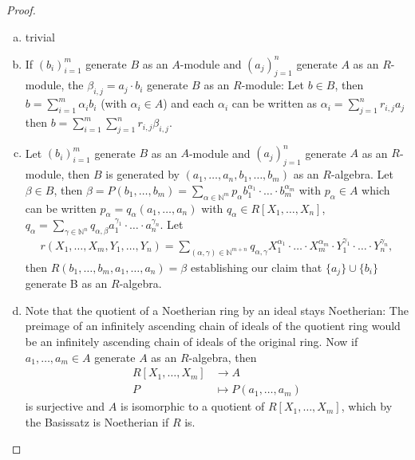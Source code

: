 \documentclass[DIV=14,parskip=half]{scrartcl}
\theoremstyle{definition}
\newcommand{\N}{\mathbb{N}}
\newcommand{\longto}{\longrightarrow}
\newcommand{\ldotspam}{,\ldots,}
\begin{document}
\begin{proof}
 \begin{enumerate}[a)]
  \item trivial
  \item If $(b_i)_{i=1}^m$ generate $B$ as an $A$-module and $(a_j)_{j=1}^n$ generate $A$ as an $R$-module, the $\beta_{i,j} = a_j\cdot b_i$ generate $B$ as an $R$-module: Let $b\in B$, then $b = \sum_{i=1}^m \alpha_i b_i$ (with $\alpha_i\in A$) and each $\alpha_i$ can be written as $\alpha_i = \sum_{j=1}^n r_{i,j}a_j$ then $b = \sum_{i=1}^m \sum_{j=1}^n r_{i,j} \beta_{i,j}$.
  \item Let $(b_i)_{i=1}^m$ generate $B$ as an $A$-module and $(a_j)_{j=1}^n$ generate $A$ as an $R$-module, then $B$ is generated by $(a_1,\ldots, a_n, b_1,\ldots, b_m)$ as an $R$-algebra. Let $\beta\in B$, then $\beta = P(b_1\ldotspam b_m) = \sum_{\alpha\in\N^m} p_\alpha b_1^{\alpha_1}\cdot\ldots\cdot b_m^{\alpha_m}$ with $p_\alpha \in A$ which can be written $p_\alpha = q_\alpha(a_1\ldotspam a_n)$ with $q_\alpha \in  R[X_1\ldotspam X_n]$, $q_\alpha= \sum_{\gamma\in \N^n} q_{\alpha,\beta}  a_1^{\gamma_1}\cdot\ldots\cdot a_n^{\gamma_n}$. Let 
  \begin{align*}
  r(X_1\ldotspam X_m, Y_1\ldotspam Y_n) = \sum_{(\alpha,\gamma)\in \N^{m+n}} q_{\alpha,\gamma} X_1^{\alpha_1}\cdot\ldots\cdot X_m^{\alpha_m}\cdot Y_1^{\gamma_1}\cdot\ldots\cdot Y_n^{\gamma_n},
  \end{align*}
 then $R(b_1\ldotspam b_m, a_1\ldotspam a_n) = \beta$ establishing our claim that $\{a_j\}\cup\{b_i\}$ generate B as an $R$-algebra.
  \item Note that the quotient of a Noetherian ring by an ideal stays Noetherian: The preimage of an infinitely ascending chain of ideals of the quotient ring would be an infinitely ascending chain of ideals of the original ring. Now if $a_1\ldotspam a_m\in A$ generate $A$ as an $R$-algebra, then
  \begin{align*}
   R[X_1\ldotspam X_m] &\longto A\\
   P&\longmapsto P(a_1\ldotspam a_m)
  \end{align*}
  is surjective and $A$ is isomorphic to a quotient of $R[X_1\ldotspam X_m]$, which by the Basissatz is Noetherian if $R$ is.
 \end{enumerate}
 \end{proof}
\end{document}
